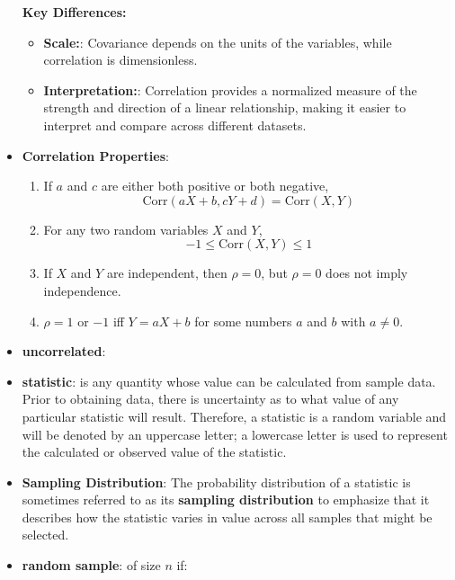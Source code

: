 \documentclass{report}
\begin{document}
\begin{itemize}
            \textbf{Key Differences:}
            \begin{itemize}
                \item \textbf{Scale:}: Covariance depends on the units of the variables, while correlation is dimensionless.
                \item \textbf{Interpretation:}: Correlation provides a normalized measure of the strength and direction of a linear relationship, making it easier to interpret and compare across different datasets.
            \end{itemize}

        \item \textbf{Correlation Properties}:
            \begin{enumerate}
                \item If \( a \) and \( c \) are either both positive or both negative,
                    \[
                        \text{Corr}(aX + b, cY + d) = \text{Corr}(X, Y)
                    \]
                \item For any two random variables \( X \) and \( Y \),
                    \[
                        -1 \leq \text{Corr}(X, Y) \leq 1
                    \]
                \item If \( X \) and \( Y \) are independent, then \( \rho = 0 \), but \( \rho = 0 \) does not imply independence.
                \item \( \rho = 1 \) or \( -1 \) iff \( Y = aX + b \) for some numbers \( a \) and \( b \) with \( a \neq 0 \).
            \end{enumerate}
        \item \textbf{uncorrelated}:
        \item \textbf{statistic}: is any quantity whose value can be calculated from sample data.
            Prior to obtaining data, there is uncertainty as to what value of any particular
            statistic will result. Therefore, a statistic is a random variable and will be
            denoted by an uppercase letter; a lowercase letter is used to represent the
            calculated or observed value of the statistic.
        \item \textbf{Sampling Distribution}: The probability distribution of a statistic is sometimes
            referred to as its \textbf{sampling distribution} to emphasize that it describes how the statistic varies in value across all samples that might be selected.
        \item \textbf{random sample}: of size \( n \) if:

\end{itemize}
\end{document}
